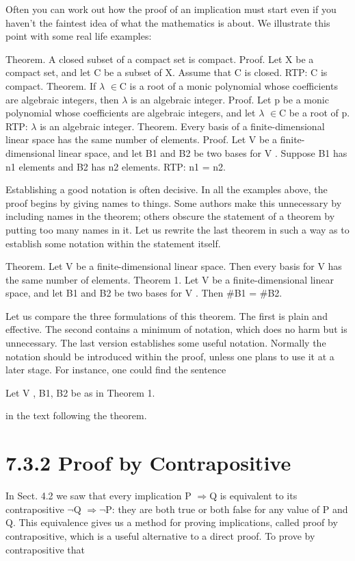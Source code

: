 \documentclass[11pt]{article}
\theoremstyle{plain}
\theoremstyle{definition}
\begin{document}
Often you can work out how the proof of an implication must start even if you haven't the faintest idea of what the mathematics is about. We illustrate this point with some real life examples:

Theorem. A closed subset of a compact set is compact. Proof. Let X be a compact set, and let C be a subset of X. Assume that C is closed. RTP: C is compact. Theorem. If $\lambda$ $\in$C is a root of a monic polynomial whose coefficients are algebraic integers, then $\lambda$ is an algebraic integer. Proof. Let p be a monic polynomial whose coefficients are algebraic integers, and let $\lambda$ $\in$C be a root of p. RTP: $\lambda$ is an algebraic integer. Theorem. Every basis of a finite-dimensional linear space has the same number of elements. Proof. Let V be a finite-dimensional linear space, and let B1 and B2 be two bases for V . Suppose B1 has n1 elements and B2 has n2 elements. RTP: n1 = n2.

Establishing a good notation is often decisive. In all the examples above, the proof begins by giving names to things. Some authors make this unnecessary by including names in the theorem; others obscure the statement of a theorem by putting too many names in it. Let us rewrite the last theorem in such a way as to establish some notation within the statement itself.

Theorem. Let V be a finite-dimensional linear space. Then every basis for V has the same number of elements. Theorem 1. Let V be a finite-dimensional linear space, and let B1 and B2 be two bases for V . Then \#B1 = \#B2.

Let us compare the three formulations of this theorem. The first is plain and effective. The second contains a minimum of notation, which does no harm but is unnecessary. The last version establishes some useful notation. Normally the notation should be introduced within the proof, unless one plans to use it at a later stage. For instance, one could find the sentence

Let V , B1, B2 be as in Theorem 1.

in the text following the theorem.

\section{7.3.2 Proof by Contrapositive}

In Sect. 4.2 we saw that every implication P $\Rightarrow$Q is equivalent to its contrapositive $\neg$Q $\Rightarrow$$\neg$P: they are both true or both false for any value of P and Q. This equivalence gives us a method for proving implications, called proof by contrapositive, which is a useful alternative to a direct proof. To prove by contrapositive that
\end{document}
